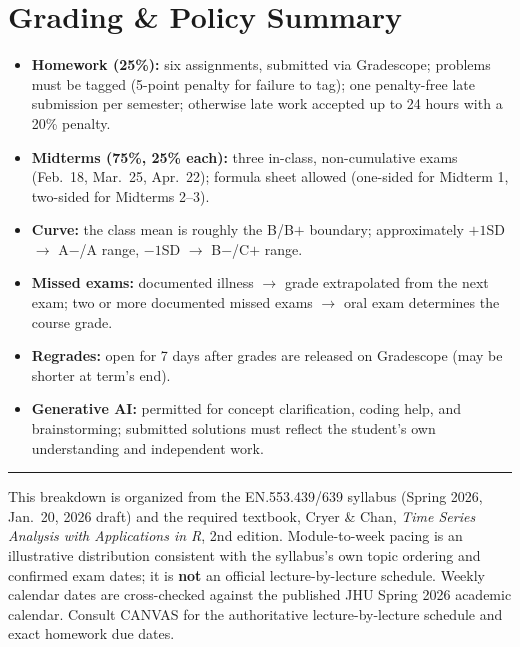 \documentclass[11pt]{article}
\begin{document}
\section{Grading \& Policy Summary}

\begin{itemize}
  \item \textbf{Homework (25\%):} six assignments, submitted via Gradescope; problems must be tagged
        (5-point penalty for failure to tag); one penalty-free late submission per semester; otherwise
        late work accepted up to 24 hours with a 20\% penalty.
  \item \textbf{Midterms (75\%, 25\% each):} three in-class, non-cumulative exams (Feb.\ 18, Mar.\ 25,
        Apr.\ 22); formula sheet allowed (one-sided for Midterm 1, two-sided for Midterms 2--3).
  \item \textbf{Curve:} the class mean is roughly the B/B$+$ boundary; approximately $+1$SD $\to$
        A$-$/A range, $-1$SD $\to$ B$-$/C$+$ range.
  \item \textbf{Missed exams:} documented illness $\to$ grade extrapolated from the next exam; two or
        more documented missed exams $\to$ oral exam determines the course grade.
  \item \textbf{Regrades:} open for 7 days after grades are released on Gradescope (may be shorter at
        term's end).
  \item \textbf{Generative AI:} permitted for concept clarification, coding help, and brainstorming;
        submitted solutions must reflect the student's own understanding and independent work.
\end{itemize}

\vspace{1.5em}
\hrule
\vspace{0.5em}
{\footnotesize This breakdown is organized from the EN.553.439/639 syllabus (Spring 2026, Jan.\ 20,
2026 draft) and the required textbook, Cryer \& Chan, \emph{Time Series Analysis with Applications in
R}, 2nd edition. Module-to-week pacing is an illustrative distribution consistent with the syllabus's
own topic ordering and confirmed exam dates; it is \textbf{not} an official lecture-by-lecture
schedule. Weekly calendar dates are cross-checked against the published JHU Spring 2026 academic
calendar. Consult CANVAS for the authoritative lecture-by-lecture schedule and exact homework due
dates.}
\end{document}
